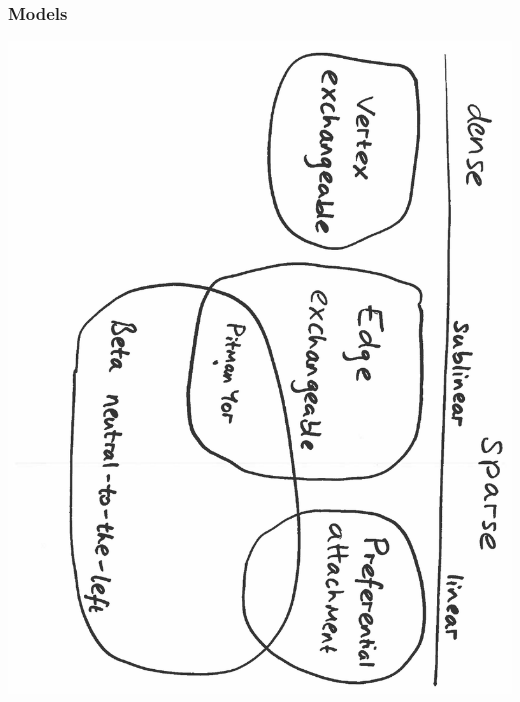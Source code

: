 \documentclass[final,hyperref={pdfpagelabels=false},noamsthm]{beamer}
\begin{document}
\begin{frame}
	\frametitle{Models}
	\includegraphics[angle=90,origin=c,scale=0.4]{fig/models6}
\end{frame}
\end{document}
